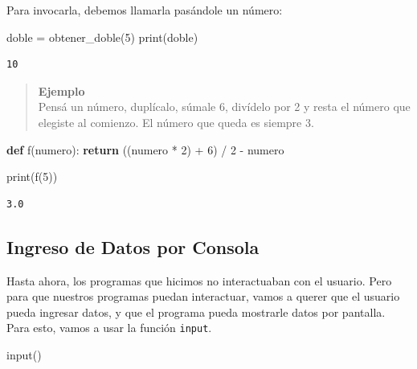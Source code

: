 \documentclass[
  letterpaper,
  DIV=11,
  numbers=noendperiod]{scrreprt}
\newenvironment{Shaded}{\begin{snugshade}}{\end{snugshade}}
\newcommand{\BuiltInTok}[1]{\textcolor[rgb]{0.00,0.23,0.31}{#1}}
\newcommand{\ControlFlowTok}[1]{\textcolor[rgb]{0.00,0.23,0.31}{\textbf{#1}}}
\newcommand{\DecValTok}[1]{\textcolor[rgb]{0.68,0.00,0.00}{#1}}
\newcommand{\KeywordTok}[1]{\textcolor[rgb]{0.00,0.23,0.31}{\textbf{#1}}}
\newcommand{\NormalTok}[1]{\textcolor[rgb]{0.00,0.23,0.31}{#1}}
\newcommand{\OperatorTok}[1]{\textcolor[rgb]{0.37,0.37,0.37}{#1}}
\begin{document}
Para invocarla, debemos llamarla pasándole un número:

\begin{Shaded}
\begin{Highlighting}[]
\NormalTok{doble }\OperatorTok{=}\NormalTok{ obtener\_doble(}\DecValTok{5}\NormalTok{)}
\BuiltInTok{print}\NormalTok{(doble)}
\end{Highlighting}
\end{Shaded}

\begin{verbatim}
10
\end{verbatim}

\begin{quote}
\textbf{Ejemplo}\\
Pensá un número, duplícalo, súmale 6, divídelo por 2 y resta el número
que elegiste al comienzo. El número que queda es siempre 3.
\end{quote}

\begin{Shaded}
\begin{Highlighting}[]
\KeywordTok{def}\NormalTok{ f(numero):}
  \ControlFlowTok{return}\NormalTok{ ((numero }\OperatorTok{*} \DecValTok{2}\NormalTok{) }\OperatorTok{+} \DecValTok{6}\NormalTok{) }\OperatorTok{/} \DecValTok{2} \OperatorTok{{-}}\NormalTok{ numero}
\end{Highlighting}
\end{Shaded}

\begin{Shaded}
\begin{Highlighting}[]
\BuiltInTok{print}\NormalTok{(f(}\DecValTok{5}\NormalTok{))}
\end{Highlighting}
\end{Shaded}

\begin{verbatim}
3.0
\end{verbatim}

\subsection{Ingreso de Datos por
Consola}\label{ingreso-de-datos-por-consola}

Hasta ahora, los programas que hicimos no interactuaban con el usuario.
Pero para que nuestros programas puedan interactuar, vamos a querer que
el usuario pueda ingresar datos, y que el programa pueda mostrarle datos
por pantalla. Para esto, vamos a usar la función \texttt{input}.

\begin{Shaded}
\begin{Highlighting}[]
\BuiltInTok{input}\NormalTok{()}
\end{Highlighting}
\end{Shaded}
\end{document}
